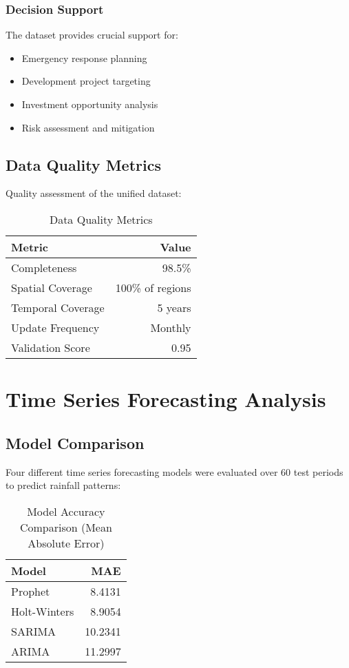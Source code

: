 \documentclass[12pt,a4paper]{article}
\begin{document}
\subsubsection{Decision Support}
The dataset provides crucial support for:
\begin{itemize}
    \item Emergency response planning
    \item Development project targeting
    \item Investment opportunity analysis
    \item Risk assessment and mitigation
\end{itemize}

\subsection{Data Quality Metrics}
Quality assessment of the unified dataset:
\begin{table}[H]
\centering
\begin{tabular}{@{}lr@{}}
\toprule
\textbf{Metric} & \textbf{Value} \\
\midrule
Completeness & 98.5\% \\
Spatial Coverage & 100\% of regions \\
Temporal Coverage & 5 years \\
Update Frequency & Monthly \\
Validation Score & 0.95 \\
\bottomrule
\end{tabular}
\caption{Data Quality Metrics}
\label{tab:quality-metrics}
\end{table}

\section{Time Series Forecasting Analysis}
\subsection{Model Comparison}
Four different time series forecasting models were evaluated over 60 test periods to predict rainfall patterns:

\begin{table}[H]
\centering
\begin{tabular}{@{}lr@{}}
\toprule
\textbf{Model} & \textbf{MAE} \\
\midrule
Prophet & 8.4131 \\
Holt-Winters & 8.9054 \\
SARIMA & 10.2341 \\
ARIMA & 11.2997 \\
\bottomrule
\end{tabular}
\caption{Model Accuracy Comparison (Mean Absolute Error)}
\label{tab:model-comparison}
\end{table}
\end{document}

